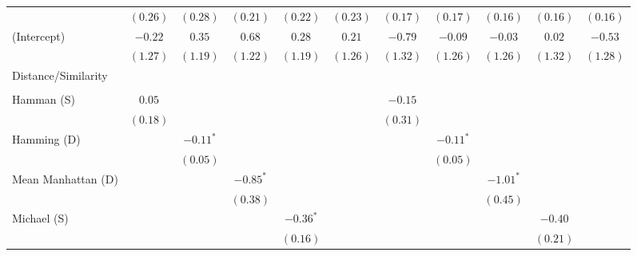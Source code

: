 \documentclass[]{article}
\begin{document}
\begin{landscape}
\begin{table}
\begin{center}
\begin{tabular}{l c c c c c c c c c c }
                           & $(0.26)$    & $(0.28)$     & $(0.21)$    & $(0.22)$     & $(0.23)$    & $(0.17)$    & $(0.17)$     & $(0.16)$    & $(0.16)$    & $(0.16)$    \\
(Intercept)                & $-0.22$     & $0.35$       & $0.68$      & $0.28$       & $0.21$      & $-0.79$     & $-0.09$      & $-0.03$     & $0.02$      & $-0.53$     \\
                           & $(1.27)$    & $(1.19)$     & $(1.22)$    & $(1.19)$     & $(1.26)$    & $(1.32)$    & $(1.26)$     & $(1.26)$    & $(1.32)$    & $(1.28)$    \\
Distance/Similarity        &             &              &             &              &             &             &              &             &             &             \\
                           &             &              &             &              &             &             &              &             &             &             \\
\quad Hamman (S)           & $0.05$      &              &             &              &             & $-0.15$     &              &             &             &             \\
                           & $(0.18)$    &              &             &              &             & $(0.31)$    &              &             &             &             \\
\quad Hamming (D)          &             & $-0.11^{*}$  &             &              &             &             & $-0.11^{*}$  &             &             &             \\
                           &             & $(0.05)$     &             &              &             &             & $(0.05)$     &             &             &             \\
\quad Mean Manhattan (D)   &             &              & $-0.85^{*}$ &              &             &             &              & $-1.01^{*}$ &             &             \\
                           &             &              & $(0.38)$    &              &             &             &              & $(0.45)$    &             &             \\
\quad Michael (S)          &             &              &             & $-0.36^{*}$  &             &             &              &             & $-0.40$     &             \\
                           &             &              &             & $(0.16)$     &             &             &              &             & $(0.21)$    &             \\

\end{tabular}
\end{center}
\end{table}
\end{landscape}
\end{document}
